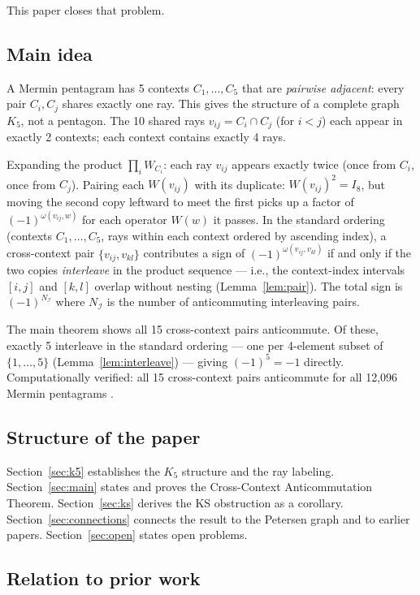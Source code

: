 \documentclass[11pt,a4paper]{article}
\theoremstyle{remark}
\begin{document}
This paper closes that problem.

\subsection*{Main idea}

A Mermin pentagram has 5 contexts $C_1, \ldots, C_5$ that are
\emph{pairwise adjacent}: every pair $C_i, C_j$ shares exactly one ray.
This gives the structure of a complete graph $K_5$, not a pentagon.
The 10 shared rays $v_{ij} = C_i \cap C_j$ (for $i < j$) each appear in
exactly 2 contexts; each context contains exactly 4 rays.

Expanding the product $\prod_i W_{C_i}$:
each ray $v_{ij}$ appears exactly twice (once from $C_i$, once from $C_j$).
Pairing each $W(v_{ij})$ with its duplicate:
$W(v_{ij})^2 = I_8$, but moving the second copy leftward to meet the first
picks up a factor of $(-1)^{\omega(v_{ij}, w)}$ for each operator $W(w)$
it passes.
In the standard ordering (contexts $C_1,\ldots,C_5$, rays within each
context ordered by ascending index), a cross-context pair
$\{v_{ij},v_{kl}\}$ contributes a sign of $(-1)^{\omega(v_{ij},v_{kl})}$
if and only if the two copies \emph{interleave} in the product sequence
--- i.e., the context-index intervals $[i,j]$ and $[k,l]$
overlap without nesting (Lemma~\ref{lem:pair}).
The total sign is $(-1)^{N_\mathcal{I}}$
where $N_\mathcal{I}$ is the number of anticommuting interleaving pairs.

The main theorem shows all 15 cross-context pairs anticommute.
Of these, exactly 5 interleave in the standard ordering ---
one per 4-element subset of $\{1,\ldots,5\}$ (Lemma~\ref{lem:interleave})
--- giving $(-1)^5 = -1$ directly.
Computationally verified: all 15 cross-context pairs anticommute
for all 12{,}096 Mermin pentagrams \cite{PaperXVIIsuppl}.

\subsection*{Structure of the paper}

Section~\ref{sec:k5} establishes the $K_5$ structure and the ray labeling.
Section~\ref{sec:main} states and proves the Cross-Context Anticommutation
Theorem.
Section~\ref{sec:ks} derives the KS obstruction as a corollary.
Section~\ref{sec:connections} connects the result to the Petersen graph
and to earlier papers.
Section~\ref{sec:open} states open problems.

\subsection*{Relation to prior work}
\end{document}

